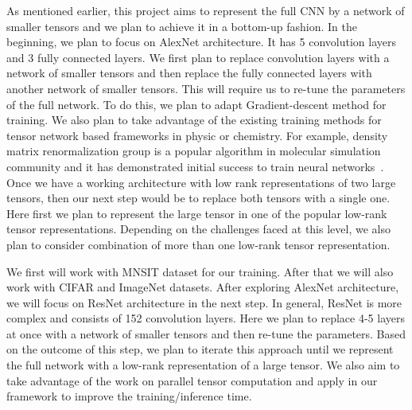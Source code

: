 As mentioned earlier, this project aims to represent the full CNN by a network of smaller tensors and we plan to achieve it in a bottom-up fashion. In the beginning, we plan to focus on AlexNet architecture. It has 5 convolution layers and 3 fully connected layers. We first plan to replace convolution layers with a network of smaller tensors and then replace the fully connected layers with another network of smaller tensors. This will require us to re-tune the parameters of the full network. To do this, we plan to adapt Gradient-descent method for training. We also plan to take advantage of the existing training methods for tensor network based frameworks in physic or chemistry. For example, density matrix renormalization group is a popular algorithm in molecular simulation community and it has demonstrated initial success to train neural networks~\cite{SS-NIPS2016}. Once we have a working architecture with low rank representations of two large tensors, then our next step would be to replace both tensors with a single one. Here first we plan to represent the large tensor in one of the popular low-rank tensor representations. Depending on the challenges faced at this level, we also plan to consider combination of more than one low-rank tensor representation.    


We first will work with  MNSIT dataset for our training. After that we will also work with CIFAR and ImageNet datasets. After exploring AlexNet architecture, we will focus on ResNet architecture in the next step. In general, ResNet is more complex and consists of 152 convolution layers. Here we plan to replace 4-5 layers at once with a network of smaller tensors and then re-tune the parameters. Based on the outcome of this step, we plan to iterate this approach until we represent the full network with a low-rank representation of a large tensor. We also aim to take advantage of the  work on parallel tensor computation and apply in our framework to improve the training/inference time.


